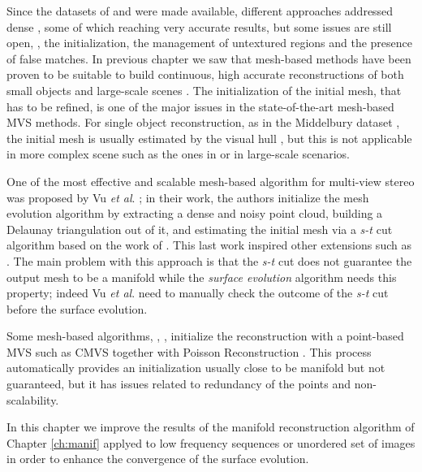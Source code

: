 Since the datasets of \cite{seitz_et_al06} and \cite{strecha2008} were made available, different approaches addressed dense \mvs, some of which reaching very accurate results, but some issues are still open, \eg, the initialization, the management of untextured regions and the presence of false matches.
In previous chapter we saw that mesh-based methods have been proven to be suitable to build continuous, high accurate reconstructions of both small objects and large-scale scenes \cite{hiep2009towards,vu_et_al_2012,salman2010surface}. 
The initialization of the initial mesh, that has to be refined, is one of the major issues in the state-of-the-art mesh-based MVS methods. For single object reconstruction, as in the Middelbury dataset \cite{seitz_et_al06}, the initial mesh is usually estimated by the visual hull \cite{laurentini1994visual}, but this is not applicable in more complex scene such as the ones in \cite{strecha2008} or in large-scale scenarios.

One of the most effective and scalable mesh-based algorithm for multi-view stereo was proposed by Vu \emph{et al}. \cite{vu_et_al_2012}; in their work, the authors initialize the mesh evolution algorithm by extracting a dense and noisy point cloud, building a Delaunay triangulation out of it, and estimating the initial mesh via a \emph{s-t} cut algorithm based on the work of \cite{labatut2007efficient}. 
This last work inspired other extensions such as \cite{jancosek2011multi}.
The main problem with this approach is that the \emph{s-t} cut does not guarantee the output mesh to be a manifold while the \emph{surface evolution} algorithm needs this property; indeed Vu \emph{et al}.  need to manually check the outcome of the \emph{s-t} cut before the surface evolution.

Some mesh-based algorithms, \eg, \cite{pan2015automatic,li2015detail}, initialize the reconstruction with a point-based MVS such as CMVS \cite{fu10} together with Poisson Reconstruction \cite{kazhdan2006poisson}.
This process automatically provides an initialization usually close to be manifold but not guaranteed, but it has issues related to redundancy of the points and non-scalability.
\begin{mdframed}[hidealllines=true,backgroundcolor=blue!20]
In this chapter we improve the results of the manifold reconstruction algorithm of Chapter {\ref{ch:manif}} applyed to low frequency sequences or unordered set of images in order to enhance the convergence of the surface evolution.
\end{mdframed}

